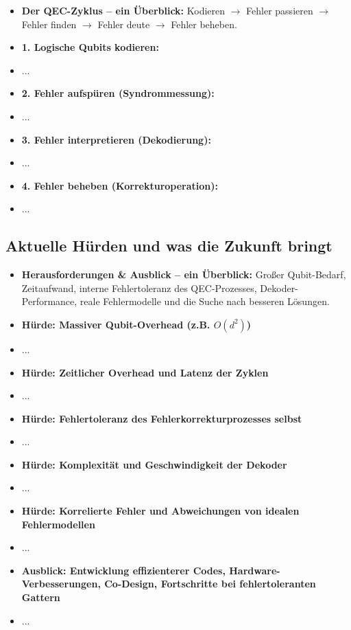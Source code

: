 \begin{itemize}
    \item \textbf{Der QEC-Zyklus -- ein Überblick:} Kodieren $\rightarrow$ Fehler passieren $\rightarrow$ Fehler finden $\rightarrow$ Fehler deute $\rightarrow$ Fehler beheben.
    \item \textbf{1. Logische Qubits kodieren:}
    \item ...
    \item \textbf{2. Fehler aufspüren (Syndrommessung):}
    \item ...
    \item \textbf{3. Fehler interpretieren (Dekodierung):}
    \item ...
    \item \textbf{4. Fehler beheben (Korrekturoperation):}
    \item ...
\end{itemize}

\subsection{Aktuelle Hürden und was die Zukunft bringt}
\begin{itemize}
    \item \textbf{Herausforderungen \& Ausblick -- ein Überblick:} Großer Qubit-Bedarf, Zeitaufwand, interne Fehlertoleranz des QEC-Prozesses, Dekoder-Performance, reale Fehlermodelle und die Suche nach besseren Lösungen.
    \item \textbf{Hürde: Massiver Qubit-Overhead (z.B. $O(d^2)$)}
    \item ...
    \item \textbf{Hürde: Zeitlicher Overhead und Latenz der Zyklen}
    \item ...
    \item \textbf{Hürde: Fehlertoleranz des Fehlerkorrekturprozesses selbst}
    \item ...
    \item \textbf{Hürde: Komplexität und Geschwindigkeit der Dekoder}
    \item ...
    \item \textbf{Hürde: Korrelierte Fehler und Abweichungen von idealen Fehlermodellen}
    \item ...
    \item \textbf{Ausblick: Entwicklung effizienterer Codes, Hardware-Verbesserungen, Co-Design, Fortschritte bei fehlertoleranten Gattern}
    \item ...
\end{itemize}

